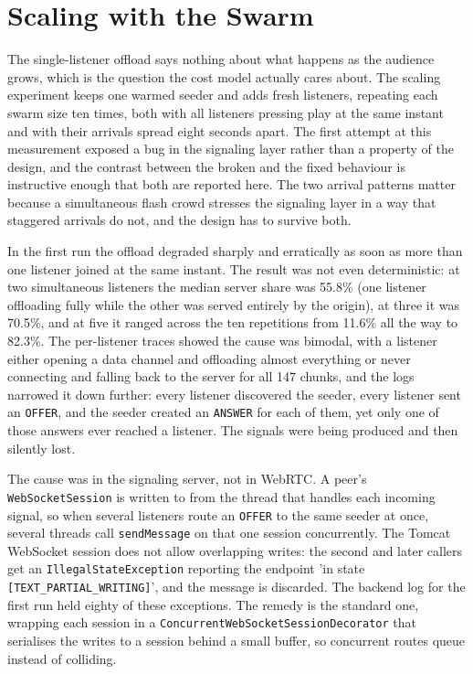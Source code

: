 \section{Scaling with the Swarm}
\label{sec:eval-scaling}

\indent \par The single-listener offload says nothing about what happens as the audience grows, which is the question the cost model actually cares about. The scaling experiment keeps one warmed seeder and adds fresh listeners, repeating each swarm size ten times, both with all listeners pressing play at the same instant and with their arrivals spread eight seconds apart. The first attempt at this measurement exposed a bug in the signaling layer rather than a property of the design, and the contrast between the broken and the fixed behaviour is instructive enough that both are reported here. The two arrival patterns matter because a simultaneous flash crowd stresses the signaling layer in a way that staggered arrivals do not, and the design has to survive both.

\par In the first run the offload degraded sharply and erratically as soon as more than one listener joined at the same instant. The result was not even deterministic: at two simultaneous listeners the median server share was 55.8\% (one listener offloading fully while the other was served entirely by the origin), at three it was 70.5\%, and at five it ranged across the ten repetitions from 11.6\% all the way to 82.3\%. The per-listener traces showed the cause was bimodal, with a listener either opening a data channel and offloading almost everything or never connecting and falling back to the server for all 147 chunks, and the logs narrowed it down further: every listener discovered the seeder, every listener sent an \texttt{OFFER}, and the seeder created an \texttt{ANSWER} for each of them, yet only one of those answers ever reached a listener. The signals were being produced and then silently lost.

\par The cause was in the signaling server, not in WebRTC. A peer's \texttt{WebSocketSession} is written to from the thread that handles each incoming signal, so when several listeners route an \texttt{OFFER} to the same seeder at once, several threads call \texttt{sendMessage} on that one session concurrently. The Tomcat WebSocket session does not allow overlapping writes: the second and later callers get an \texttt{IllegalStateException} reporting the endpoint 'in state \texttt{[TEXT\_PARTIAL\_WRITING]}', and the message is discarded. The backend log for the first run held eighty of these exceptions. The remedy is the standard one, wrapping each session in a \texttt{ConcurrentWebSocketSessionDecorator} that serialises the writes to a session behind a small buffer, so concurrent routes queue instead of colliding.

